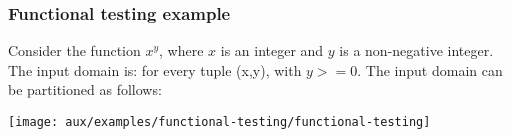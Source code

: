 \begin{frame}[hasprev=false,hasnext=false]
\label{example:functional-testing}
\frametitle{Functional testing example}

Consider the function $x^y$, where $x$ is an integer and $y$ is a non-negative
integer. The input domain is: for every tuple (x,y), with $y >= 0$. The input
domain can be partitioned as follows:

\begin{block:ie}{}
    \centering
    \texttt{[image: aux/examples/functional-testing/functional-testing]}
\end{block:ie}
\end{frame}

